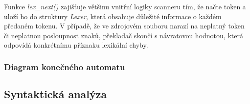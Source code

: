 \documentclass[a4paper, 12pt]{article} %
\begin{document}
            Funkce \textit{lex\_next()} zajišťuje většinu vnitřní logiky scanneru tím, že načte 
            token a uloží ho do struktury \textit{Lexer}, která obsahuje důležité informace o každém 
            předaném tokenu. V případě, že ve zdrojovém souboru narazí na neplatný token či neplatnou
            posloupnost znaků, překladač skončí s návratovou hodnotou, která odpovídá konkrétnímu 
            příznaku lexikální chyby. 


            \newpage
            \subsubsection{Diagram konečného automatu} \label{kodiagram}

            \newpage


        \subsection{Syntaktická analýza} \label{syntactics}
\end{document}
